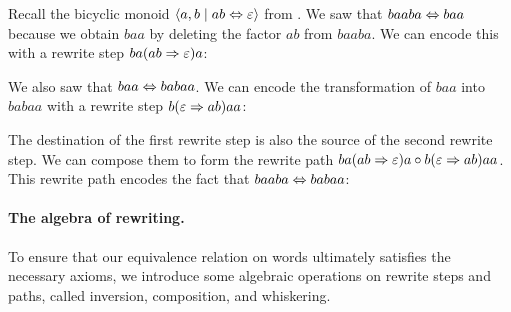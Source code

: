 \documentclass[../generics]{subfiles}
\begin{document}
\begin{example}\label{bicyclic 2}
Recall the bicyclic monoid $\langle a, b \mid ab\Leftrightarrow\varepsilon\rangle$ from . We saw that $baaba\Leftrightarrow baa$ because we obtain $baa$ by deleting the factor $ab$ from $baaba$. We can encode this with a rewrite step $ba(ab\Rightarrow\varepsilon) a$:
\begin{center}
\end{center}
We also saw that $baa\Leftrightarrow babaa$. We can encode the transformation of $baa$ into $babaa$ with a rewrite step $b(\varepsilon\Rightarrow ab) aa$:
\begin{center}
\end{center}
The destination of the first rewrite step is also the source of the second rewrite step. We can compose them to form the rewrite path $ba(ab\Rightarrow\varepsilon) a\circ b(\varepsilon\Rightarrow ab) aa$. This rewrite path encodes the fact that $baaba\Leftrightarrow babaa$:
\begin{center}
\end{center}
\end{example}

\paragraph{The algebra of rewriting.} To ensure that our equivalence relation on words ultimately satisfies the necessary axioms, we introduce some algebraic operations on rewrite steps and paths, called inversion, composition, and whiskering.
\end{document}
